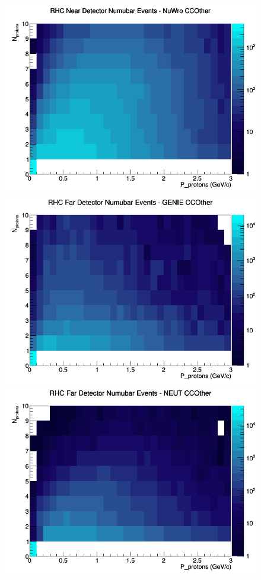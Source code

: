 \begin{figure}[h]
\includegraphics[width=\linewidth]{N_P/nominal/protons/CCOther_RHC_ND_numubar_N_P_NuWro.png}
\endminipage
\newline
{}
\includegraphics[width=\linewidth]{N_P/nominal/protons/CCOther_RHC_FD_numubar_N_P_GENIE.png}
\endminipage
{}
\includegraphics[width=\linewidth]{N_P/nominal/protons/CCOther_RHC_FD_numubar_N_P_NEUT.png}

\end{figure}
